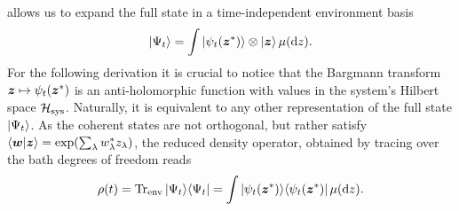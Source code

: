  allows us to expand the full state in a time-independent environment basis
\begin{equation*}
  | \Psi_t \rangle = \int | \psi_t({\boldsymbol{z}}^*) \rangle \otimes | \boldsymbol{z} \rangle \, \mu(\mathrm{d} z).
\end{equation*}
For the following derivation it is crucial to notice that the Bargmann transform $\boldsymbol{z} \mapsto \psi_t({\boldsymbol{z}}^*)$ is an anti-holomorphic function with values in the system's Hilbert space $\mathcal{H}_\mathrm{sys}$.
Naturally, it is equivalent to any other representation of the full state $| \Psi_t \rangle$.
As the coherent states are not orthogonal, but rather satisfy $\braket{\vec w}{\vec z} = \exp(\sum_\lambda \cc w_\lambda z_\lambda)$, the reduced density operator, obtained by tracing over the bath degrees of freedom reads
\begin{equation}
  \rho(t) = \operatorname{Tr}_\mathrm{env} | \Psi_t \rangle\langle \Psi_t |
          = \int | \psi_t({\boldsymbol{z}}^*) \rangle\langle \psi_t({\boldsymbol{z}}^*) | \, \mu(\mathrm{d} z).
  \label{eq:nmqsd.reduced_matrix}
\end{equation}

